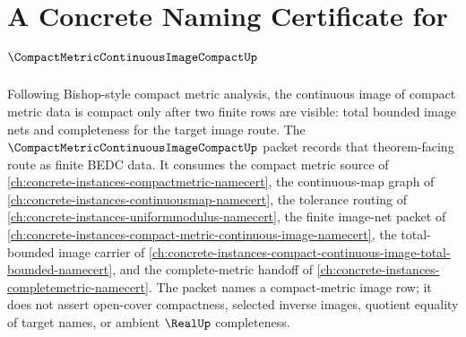 \chapter{A Concrete Naming Certificate for $\CompactMetricContinuousImageCompactUp$}
\label{ch:concrete-instances-compact-metric-continuous-image-compact-namecert}

Following Bishop-style compact metric analysis, the continuous image of compact metric data is compact only after two finite rows are visible: total bounded image nets and completeness for the target image route. The $\CompactMetricContinuousImageCompactUp$ packet records that theorem-facing route as finite BEDC data. It consumes the compact metric source of \autoref{ch:concrete-instances-compactmetric-namecert}, the continuous-map graph of \autoref{ch:concrete-instances-continuousmap-namecert}, the tolerance routing of \autoref{ch:concrete-instances-uniformmodulus-namecert}, the finite image-net packet of \autoref{ch:concrete-instances-compact-metric-continuous-image-namecert}, the total-bounded image carrier of \autoref{ch:concrete-instances-compact-continuous-image-total-bounded-namecert}, and the complete-metric handoff of \autoref{ch:concrete-instances-completemetric-namecert}. The packet names a compact-metric image row; it does not assert open-cover compactness, selected inverse images, quotient equality of target names, or ambient $\RealUp$ completeness.

